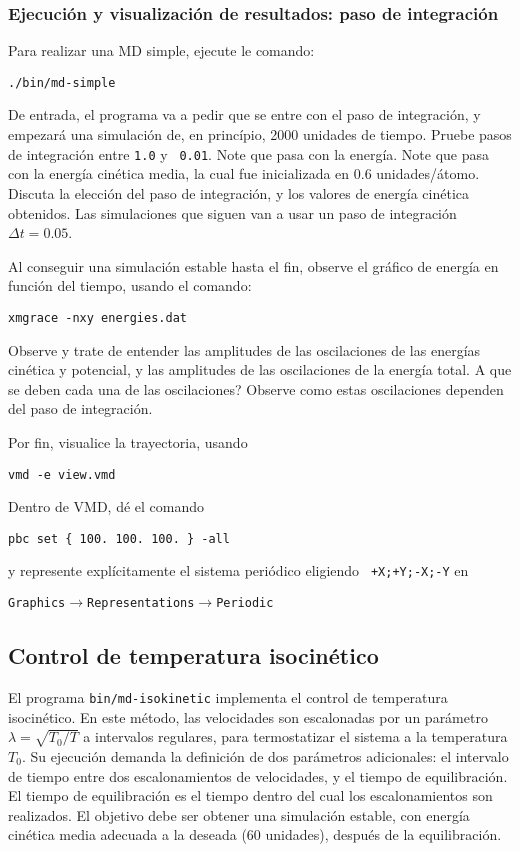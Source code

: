 \documentclass[10pt,a4paper,ssfamily]{exam}
\newcommand{\1}{{\bf 1}}
\newcommand{\2}{{\bf 2}}
\newcommand{\3}{{\bf 3}}
\newcommand{\command}[1]{\begin{center}{\tt #1}\end{center}}
\begin{document}
\subsubsection{Ejecución y visualización de resultados: paso de
integración} 

Para realizar una MD simple, ejecute le comando:
\command{./bin/md-simple} 
De entrada, el programa va a pedir que se
entre con el paso de integración, y empezará una simulación de, en princípio,
2000 unidades de tiempo.  Pruebe pasos de integración entre {\tt 1.0} y {\tt
0.01}. Note que pasa con la energía. Note que pasa con la energía
cinética media, la cual fue inicializada en 0.6 unidades/átomo. Discuta
la elección del paso de integración, y los valores de energía cinética
obtenidos. Las simulaciones que siguen van a usar un paso de integración
$\Delta t = 0.05$.

Al conseguir una simulación estable hasta
el fin, observe el gráfico de energía en función del tiempo, usando el
comando:
\command{xmgrace -nxy energies.dat}
Observe y trate de entender las amplitudes de las oscilaciones de las
energías cinética y potencial, y las amplitudes de las
oscilaciones de la energía total. A que se deben cada una de las
oscilaciones? Observe como estas oscilaciones dependen del paso de
integración.

Por fin, visualice la trayectoria, usando
\command{vmd -e view.vmd}
Dentro de VMD, dé el comando 
\command{pbc set \{ 100. 100. 100. \} -all}
y represente explícitamente el sistema periódico eligiendo {\tt
+X;+Y;-X;-Y} en
\command{Graphics$\to$Representations$\to$Periodic}


\subsection{Control de temperatura isocinético}

El programa {\tt bin/md-isokinetic} implementa el control de temperatura
isocinético. En este método, las velocidades son escalonadas por un
parámetro $\lambda = \sqrt{T_0/T}$ a intervalos regulares, para
termostatizar el sistema a la temperatura $T_0$. 
Su ejecución demanda la definición de dos parámetros
adicionales: el intervalo de tiempo entre dos escalonamientos de
velocidades, y el tiempo de equilibración. El tiempo de equilibración es
el tiempo dentro del cual los escalonamientos son realizados. El
objetivo debe ser obtener una simulación estable, con energía cinética
media adecuada a la deseada (60 unidades), después de la equilibración.
\end{document}
